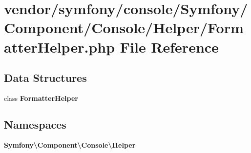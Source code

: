 \section{vendor/symfony/console/\+Symfony/\+Component/\+Console/\+Helper/\+Formatter\+Helper.php File Reference}
\label{_formatter_helper_8php}
\subsection*{Data Structures}
\begin{DoxyCompactItemize}
\item 
class {\bf Formatter\+Helper}
\end{DoxyCompactItemize}
\subsection*{Namespaces}
\begin{DoxyCompactItemize}
\item 
 {\bf Symfony\textbackslash{}\+Component\textbackslash{}\+Console\textbackslash{}\+Helper}
\end{DoxyCompactItemize}

